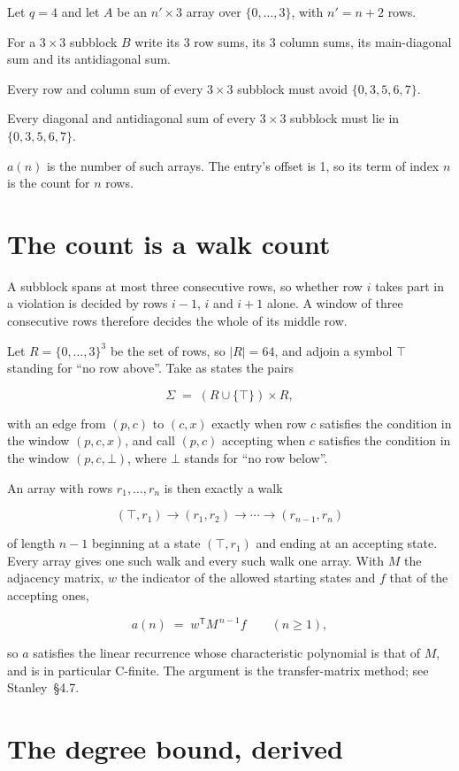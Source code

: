 \documentclass[11pt]{article}
\theoremstyle{definition}
\begin{document}
Let $q = 4$ and let $A$ be an $n' \times 3$ array over $\{0,\dots,3\}$, with $n' = n + 2$ rows.

For a $3\times3$ subblock $B$ write its 3 row sums, its 3 column sums, its main-diagonal sum and its antidiagonal sum.

Every row and column sum of every $3\times3$ subblock must avoid $\{0, 3, 5, 6, 7\}$.

Every diagonal and antidiagonal sum of every $3\times3$ subblock must lie in $\{0, 3, 5, 6, 7\}$.

$a(n)$ is the number of such arrays. The entry's offset is 1, so its term of index $n$ is the count for $n$ rows.

\section{The count is a walk count}

A subblock spans at most three consecutive rows, so whether row $i$ takes part in a violation is decided by rows $i-1$, $i$ and $i+1$ alone. A window of three consecutive rows therefore decides the whole of its middle row.

Let $R = \{0,\dots,3\}^{3}$ be the set of rows, so $|R| = 64$, and adjoin a symbol $\top$ standing for ``no row above''. Take as states the pairs

\[\Sigma \;=\; (R \cup \{\top\}) \times R,\]

with an edge from $(p,c)$ to $(c,x)$ exactly when row $c$ satisfies the condition in the window $(p,c,x)$, and call $(p,c)$ accepting when $c$ satisfies the condition in the window $(p,c,\bot)$, where $\bot$ stands for ``no row below''.

An array with rows $r_1,\dots,r_n$ is then exactly a walk

\[(\top,r_1) \to (r_1,r_2) \to \cdots \to (r_{n-1},r_n)\]

of length $n-1$ beginning at a state $(\top,r_1)$ and ending at an accepting state. Every array gives one such walk and every such walk one array. With $M$ the adjacency matrix, $w$ the indicator of the allowed starting states and $f$ that of the accepting ones,

\[a(n) \;=\; w^{\mathsf T} M^{\,n-1} f \qquad (n \ge 1),\]

so $a$ satisfies the linear recurrence whose characteristic polynomial is that of $M$, and is in particular C-finite. The argument is the transfer-matrix method; see Stanley~\S4.7.

\section{The degree bound, derived}
\end{document}
